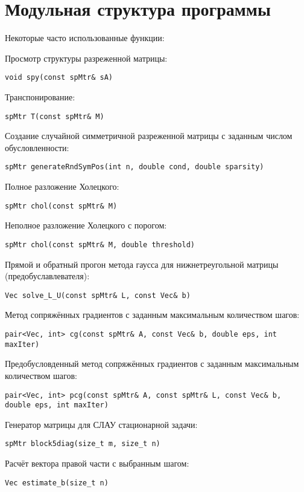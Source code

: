 \section{Модульная структура программы}
Некоторые часто использованные функции:

Просмотр структуры разреженной матрицы:

\lstinline|void spy(const spMtr& sA)|

Транспонирование:

\lstinline|spMtr T(const spMtr& M)|

Создание случайной симметричной разреженной матрицы с заданным числом обусловленности:

\lstinline|spMtr generateRndSymPos(int n, double cond, double sparsity)|

Полное разложение Холецкого:

\lstinline|spMtr chol(const spMtr& M)|

Неполное разложение Холецкого с порогом:

\lstinline|spMtr chol(const spMtr& M, double threshold)|

Прямой и обратный прогон метода гаусса для нижнетреугольной матрицы (предобуславлевателя):

\lstinline|Vec solve_L_U(const spMtr& L, const Vec& b)|

Метод сопряжённых градиентов с заданным максимальным количеством шагов:

\lstinline|pair<Vec, int> cg(const spMtr& A, const Vec& b, double eps, int maxIter)|

Предобусловденный метод сопряжённых градиентов с заданным максимальным количеством шагов:

\lstinline|pair<Vec, int> pcg(const spMtr& A, const spMtr& L, const Vec& b, double eps, int maxIter)|

Генератор матрицы для СЛАУ стационарной задачи:

\lstinline|spMtr block5diag(size_t m, size_t n)|

Расчёт вектора правой части с выбранным шагом:

\lstinline|Vec estimate_b(size_t n)|
